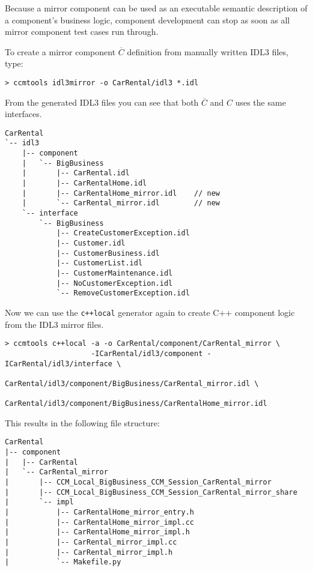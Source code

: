 \noindent
Because a mirror component can be used as an executable semantic description of 
a component's business logic, component development can stop as soon as all 
mirror component test cases run through. 




To create a mirror component $\overline{C}$ definition from manually written 
IDL3 files, type:
\begin{small}
\begin{verbatim}
> ccmtools idl3mirror -o CarRental/idl3 *.idl
\end{verbatim}
\end{small}

From the generated IDL3 files you can see that both $\overline{C}$ and $C$ 
uses the same interfaces.
\begin{small}
\begin{verbatim}
CarRental
`-- idl3
    |-- component
    |   `-- BigBusiness
    |       |-- CarRental.idl
    |       |-- CarRentalHome.idl
    |       |-- CarRentalHome_mirror.idl    // new
    |       `-- CarRental_mirror.idl        // new
    `-- interface
        `-- BigBusiness
            |-- CreateCustomerException.idl
            |-- Customer.idl
            |-- CustomerBusiness.idl
            |-- CustomerList.idl
            |-- CustomerMaintenance.idl
            |-- NoCustomerException.idl
            `-- RemoveCustomerException.idl
\end{verbatim}
\end{small}

Now we can use the {\tt c++local} generator again to create C++ component logic 
from the IDL3 mirror files.
\begin{small}
\begin{verbatim}
> ccmtools c++local -a -o CarRental/component/CarRental_mirror \
                    -ICarRental/idl3/component -ICarRental/idl3/interface \
                    CarRental/idl3/component/BigBusiness/CarRental_mirror.idl \
                    CarRental/idl3/component/BigBusiness/CarRentalHome_mirror.idl
\end{verbatim}
\end{small}
This results in the following file structure:
\begin{small}
\begin{verbatim}
CarRental 
|-- component
|   |-- CarRental
|   `-- CarRental_mirror
|       |-- CCM_Local_BigBusiness_CCM_Session_CarRental_mirror
|       |-- CCM_Local_BigBusiness_CCM_Session_CarRental_mirror_share
|       `-- impl
|           |-- CarRentalHome_mirror_entry.h
|           |-- CarRentalHome_mirror_impl.cc
|           |-- CarRentalHome_mirror_impl.h
|           |-- CarRental_mirror_impl.cc
|           |-- CarRental_mirror_impl.h
|           `-- Makefile.py
\end{verbatim}
\end{small}

